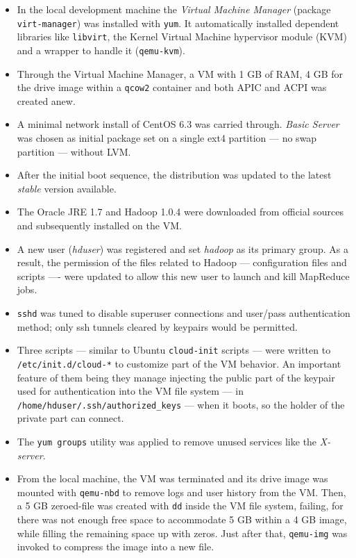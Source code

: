 \begin{itemize}
 \item In the local development machine the \emph{Virtual Machine Manager} (package \texttt{virt-manager}) was installed with \texttt{yum}. It automatically installed dependent libraries like \texttt{libvirt}, the Kernel Virtual Machine hypervisor module (KVM) and a wrapper to handle it (\texttt{qemu-kvm}).
 \item Through the Virtual Machine Manager, a VM with 1 GB of RAM, 4 GB for the drive image within a \texttt{qcow2} container and both APIC and ACPI was created anew.
 \item A minimal network install of CentOS 6.3 was carried through. \emph{Basic Server} was chosen as initial package set on a single ext4 partition --- no swap partition --- without LVM.
 \item After the initial boot sequence, the distribution was updated to the latest \emph{stable} version available.
 \item The Oracle JRE 1.7 and Hadoop 1.0.4 were downloaded from official sources and subsequently installed on the VM.
 \item A new user (\emph{hduser}) was registered and set \emph{hadoop} as its primary group. As a result, the permission of the files related to Hadoop --- configuration files and scripts ---- were updated to allow this new user to launch and kill MapReduce jobs.
 \item \texttt{sshd} was tuned to disable superuser connections and user/pass authentication method; only ssh tunnels cleared by keypairs would be permitted.
 \item Three scripts --- similar to Ubuntu \texttt{cloud-init} scripts --- were written to \texttt{/etc/init.d/cloud-*} to customize part of the VM behavior. An important feature of them being they manage injecting the public part of the keypair used for authentication into the VM file system --- in \texttt{/home/hduser/.ssh/authorized\_keys} --- when it boots, so the holder of the private part can connect.
 \item The \texttt{yum groups} utility was applied to remove unused services like the \emph{X-server}.
 \item From the local machine, the VM was terminated and its drive image was mounted with \texttt{qemu-nbd} to remove logs and user history from the VM. Then, a 5 GB zeroed-file was created with \texttt{dd} inside the VM file system, failing, for there was not enough free space to accommodate 5 GB within a 4 GB image, while filling the remaining space up with zeros. Just after that, \texttt{qemu-img} was invoked to compress the image into a new file.

\end{itemize}
